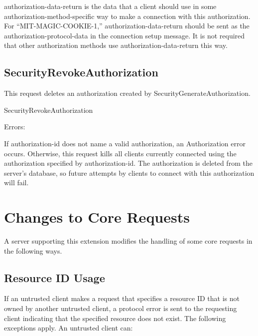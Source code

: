 authorization-data-return is the data that a client should use in some
authorization-method-specific way to make a connection with this
authorization.  For ``MIT-MAGIC-COOKIE-1,'' authorization-data-return
should be sent as the authorization-protocol-data in the connection setup
message.  It is not required that other authorization methods use
authorization-data-return this way.

\subsection{SecurityRevokeAuthorization}

This request deletes an authorization created by
SecurityGenerateAuthorization.

\begin{arequest}{SecurityRevokeAuthorization}
\end{arequest}

Errors: 

If authorization-id does not name a valid authorization, an
Authorization error occurs.  Otherwise, this request kills all clients
currently connected using the authorization specified by
authorization-id.  The authorization is deleted from the server's
database, so future attempts by clients to connect with this
authorization will fail.

\section{Changes to Core Requests}

A server supporting this extension modifies the handling of some core
requests in the following ways.

\subsection{Resource ID Usage}

If an untrusted client makes a request that specifies a resource ID
that is not owned by another untrusted client, a protocol error is
sent to the requesting client indicating that the specified resource
does not exist.  The following exceptions apply.  An untrusted client
can:

